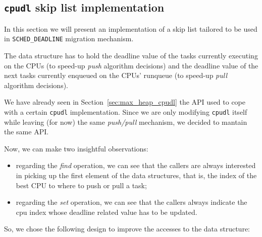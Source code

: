 \subsection{\texttt{cpudl} skip list implementation\label{sec:cpudl_skiplist}}

In this section we will present an implementation of a skip list tailored to
be used in \texttt{SCHED\_DEADLINE} migration mechanism.

The data structure has to hold the deadline value of the tasks currently 
executing on the CPUs (to speed-up \emph{push} algorithm decisions) and the 
deadline value of the next tasks currently enqueued on the CPUs' runqueue
(to speed-up \emph{pull} algorithm decisions).

We have already seen in Section~\ref{sec:max_heap_cpudl} the API used to cope 
with a certain \texttt{cpudl} implementation. Since we are only modifying
\texttt{cpudl} itself while leaving (for now) the same \emph{push/pull}
mechanism, we decided to mantain the same API.

Now, we can make two insightful observations:

\begin{itemize}
\item regarding the \emph{find} operation, we can see that the callers are always
interested in picking up the first element of the data structures, that is, the
index of the best CPU to where to push or pull a task;
\item regarding the \emph{set} operation, we can see that the callers always indicate
the cpu index whose deadline related value has to be updated.
\end{itemize}

So, we chose the following design to improve the accesses to the data structure:

